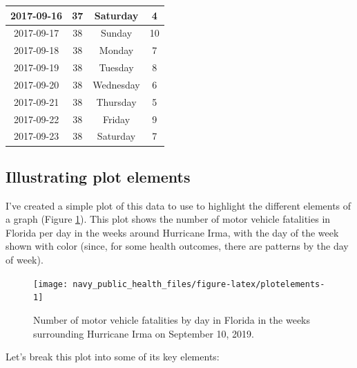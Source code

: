 \documentclass[]{tufte-book}
\begin{document}
\begin{table}[t]
\begin{tabular}{c|c|c|c}
\hline
2017-09-16 & 37 & Saturday & 4\\
\hline
2017-09-17 & 38 & Sunday & 10\\
\hline
2017-09-18 & 38 & Monday & 7\\
\hline
2017-09-19 & 38 & Tuesday & 8\\
\hline
2017-09-20 & 38 & Wednesday & 6\\
\hline
2017-09-21 & 38 & Thursday & 5\\
\hline
2017-09-22 & 38 & Friday & 9\\
\hline
2017-09-23 & 38 & Saturday & 7\\
\hline
\end{tabular}
\end{table}

\hypertarget{illustrating-plot-elements}{%
\subsection{Illustrating plot elements}\label{illustrating-plot-elements}}

I've created a simple plot of this data to use to highlight the different
elements of a graph (Figure \ref{fig:plotelements}). This plot shows the
number of motor vehicle fatalities
in Florida per day in the weeks around Hurricane Irma, with the day of the week shown
with color (since, for some health outcomes, there are patterns by the day
of week).

\begin{figure}
\texttt{[image: navy\_public\_health\_files/figure-latex/plotelements-1]} \caption[Number of motor vehicle fatalities by day in Florida in the weeks surrounding Hurricane Irma on September 10, 2019]{Number of motor vehicle fatalities by day in Florida in the weeks surrounding Hurricane Irma on September 10, 2019.}\label{fig:plotelements}
\end{figure}

Let's break this plot into some of its key elements:
\end{document}
